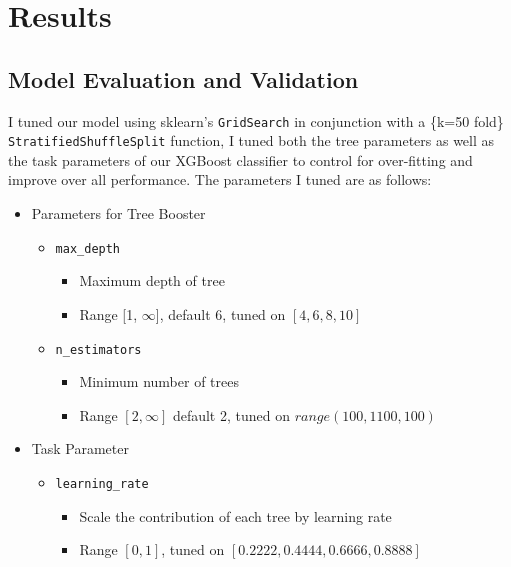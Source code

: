 



\chapter*{Results}


\section*{Model Evaluation and Validation}

I tuned our model using sklearn's \texttt{GridSearch} in conjunction with a \{k=50 fold\} \texttt{StratifiedShuffleSplit} function, I tuned both the tree parameters as well as the task parameters of our XGBoost classifier to control for over-fitting and improve over all performance. The parameters I tuned are as follows:

\begin{itemize}
\item Parameters for Tree Booster
    \begin{itemize}
        \item \texttt{max\_depth}
        \begin{itemize}
            \item Maximum depth of tree
            \item Range [1, $\infty$], default 6, tuned on $[4, 6, 8, 10]$
        \end{itemize}
        \item \texttt{n\_estimators}
        \begin{itemize}
            \item Minimum number of trees
            \item Range $[2,\infty]$ default 2, tuned on $range(100, 1100, 100)$
        \end{itemize}

    \end{itemize}

\item Task Parameter
    \begin{itemize}
        \item \texttt{learning\_rate}
        \begin{itemize}
            \item Scale the contribution of each tree by learning rate
            \item Range $[0, 1]$, tuned on $[0.2222, 0.4444, 0.6666, 0.8888]$
        \end{itemize}
    \end{itemize}
\end{itemize}

